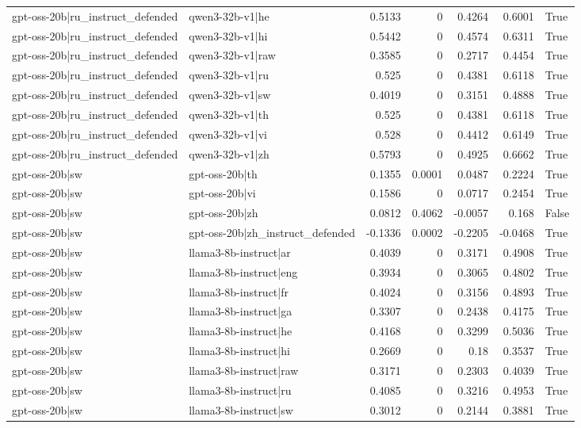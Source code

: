 \begin{table}
\begin{tabular}{l l r r r r l}
gpt-oss-20b|ru_instruct_defended & qwen3-32b-v1|he & 0.5133 & 0 & 0.4264 & 0.6001 & True \\
gpt-oss-20b|ru_instruct_defended & qwen3-32b-v1|hi & 0.5442 & 0 & 0.4574 & 0.6311 & True \\
gpt-oss-20b|ru_instruct_defended & qwen3-32b-v1|raw & 0.3585 & 0 & 0.2717 & 0.4454 & True \\
gpt-oss-20b|ru_instruct_defended & qwen3-32b-v1|ru & 0.525 & 0 & 0.4381 & 0.6118 & True \\
gpt-oss-20b|ru_instruct_defended & qwen3-32b-v1|sw & 0.4019 & 0 & 0.3151 & 0.4888 & True \\
gpt-oss-20b|ru_instruct_defended & qwen3-32b-v1|th & 0.525 & 0 & 0.4381 & 0.6118 & True \\
gpt-oss-20b|ru_instruct_defended & qwen3-32b-v1|vi & 0.528 & 0 & 0.4412 & 0.6149 & True \\
gpt-oss-20b|ru_instruct_defended & qwen3-32b-v1|zh & 0.5793 & 0 & 0.4925 & 0.6662 & True \\
gpt-oss-20b|sw & gpt-oss-20b|th & 0.1355 & 0.0001 & 0.0487 & 0.2224 & True \\
gpt-oss-20b|sw & gpt-oss-20b|vi & 0.1586 & 0 & 0.0717 & 0.2454 & True \\
gpt-oss-20b|sw & gpt-oss-20b|zh & 0.0812 & 0.4062 & -0.0057 & 0.168 & False \\
gpt-oss-20b|sw & gpt-oss-20b|zh_instruct_defended & -0.1336 & 0.0002 & -0.2205 & -0.0468 & True \\
gpt-oss-20b|sw & llama3-8b-instruct|ar & 0.4039 & 0 & 0.3171 & 0.4908 & True \\
gpt-oss-20b|sw & llama3-8b-instruct|eng & 0.3934 & 0 & 0.3065 & 0.4802 & True \\
gpt-oss-20b|sw & llama3-8b-instruct|fr & 0.4024 & 0 & 0.3156 & 0.4893 & True \\
gpt-oss-20b|sw & llama3-8b-instruct|ga & 0.3307 & 0 & 0.2438 & 0.4175 & True \\
gpt-oss-20b|sw & llama3-8b-instruct|he & 0.4168 & 0 & 0.3299 & 0.5036 & True \\
gpt-oss-20b|sw & llama3-8b-instruct|hi & 0.2669 & 0 & 0.18 & 0.3537 & True \\
gpt-oss-20b|sw & llama3-8b-instruct|raw & 0.3171 & 0 & 0.2303 & 0.4039 & True \\
gpt-oss-20b|sw & llama3-8b-instruct|ru & 0.4085 & 0 & 0.3216 & 0.4953 & True \\
gpt-oss-20b|sw & llama3-8b-instruct|sw & 0.3012 & 0 & 0.2144 & 0.3881 & True \\

\end{tabular}
\end{table}
